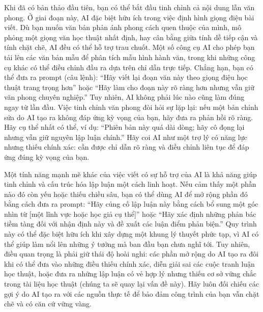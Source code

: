 Khi đã có bản thảo đầu tiên, bạn có thể bắt đầu tinh chỉnh cả nội dung lẫn văn phong. Ở giai đoạn này, AI đặc biệt hữu ích trong việc định hình giọng điệu bài viết. Dù bạn muốn văn bản phản ánh phong cách quen thuộc của mình, mô phỏng một giọng văn học thuật nhất định, hay cân bằng giữa tính dễ tiếp cận và tính chặt chẽ, AI đều có thể hỗ trợ trau chuốt. Một số công cụ AI cho phép bạn tải lên các văn bản mẫu để phân tích mẫu hình hành văn, trong khi những công cụ khác có thể điều chỉnh đầu ra dựa trên chỉ dẫn trực tiếp. Chẳng hạn, bạn có thể đưa ra prompt (câu lệnh): ``Hãy viết lại đoạn văn này theo giọng điệu học thuật trang trọng hơn'' hoặc ``Hãy làm cho đoạn này rõ ràng hơn nhưng vẫn giữ văn phong chuyên nghiệp.'' Tuy nhiên, AI không phải lúc nào cũng làm đúng ngay từ lần đầu. Việc tinh chỉnh văn phong đòi hỏi sự lặp lại: nếu một bản chỉnh sửa do AI tạo ra không đáp ứng kỳ vọng của bạn, hãy đưa ra phản hồi rõ ràng. Hãy cụ thể nhất có thể, ví dụ: ``Phiên bản này quá dài dòng; hãy cô đọng lại nhưng vẫn giữ nguyên lập luận chính.'' Hãy coi AI như một trợ lý có năng lực nhưng thiếu chính xác: cần được chỉ dẫn rõ ràng và điều chỉnh liên tục để đáp ứng đúng kỳ vọng của bạn.

Một tính năng mạnh mẽ khác của việc viết có sự hỗ trợ của AI là khả năng giúp tinh chỉnh và cấu trúc hóa lập luận một cách linh hoạt. Nếu cảm thấy một phần nào đó còn yếu hoặc thiếu chiều sâu, bạn có thể dùng AI để mở rộng phần đó bằng cách đưa ra prompt: ``Hãy củng cố lập luận này bằng cách bổ sung một góc nhìn từ {[}một lĩnh vực hoặc học giả cụ thể{]}'' hoặc ``Hãy xác định những phản bác tiềm tàng đối với nhận định này và đề xuất các luận điểm phản biện.'' Quy trình này có thể đặc biệt hữu ích khi xây dựng một khung lý thuyết phức tạp, vì AI có thể giúp làm nổi lên những ý tưởng mà ban đầu bạn chưa nghĩ tới. Tuy nhiên, điều quan trọng là phải giữ thái độ hoài nghi: các phần mở rộng do AI tạo ra đôi khi có thể đưa vào những điều thiếu chính xác, diễn giải sai các cuộc tranh luận học thuật, hoặc đưa ra những lập luận có vẻ hợp lý nhưng thiếu cơ sở vững chắc trong tài liệu học thuật (chúng ta sẽ quay lại vấn đề này). Hãy luôn đối chiếu các gợi ý do AI tạo ra với các nguồn thực tế để bảo đảm công trình của bạn vẫn chặt chẽ và có căn cứ vững vàng.

